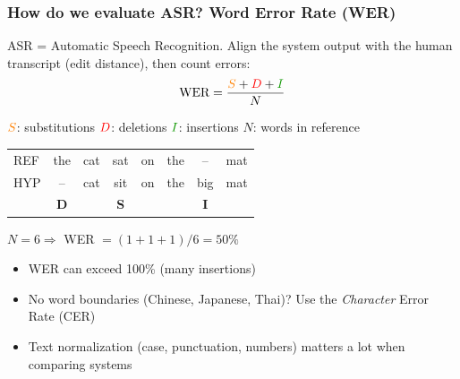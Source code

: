 \documentclass[table]{beamer}
\begin{document}


\begin{frame}\frametitle{How do we evaluate ASR? Word Error Rate (WER)}

ASR = Automatic Speech Recognition. Align the system output with the human transcript (edit distance), then count errors:
\begin{equation*}
	\text{WER} = \frac{{\color{orange}S} + {\color{red}D} + {\color{LigAikumaGreen}I}}{N}
\end{equation*}
\vspace*{-0.6em}
\begin{center}
{\small ${\color{orange}S}$: substitutions \quad ${\color{red}D}$: deletions \quad ${\color{LigAikumaGreen}I}$: insertions \quad $N$: words in reference}

\vspace*{0.6em}
\renewcommand{\arraystretch}{1.25}
\begin{tabular}{l|ccccccc}
	REF & the & cat & {\color{orange}sat} & on & the & {\color{LigAikumaGreen}--} & mat \\
	HYP & {\color{red}--} & cat & {\color{orange}sit} & on & the & {\color{LigAikumaGreen}big} & mat \\
	\hline
	    & {\color{red}\textbf{D}} & & {\color{orange}\textbf{S}} & & & {\color{LigAikumaGreen}\textbf{I}} & \\
\end{tabular}

\vspace*{0.4em}
$N=6 \Rightarrow$ WER $= (1+1+1)/6 = 50\%$
\end{center}

\vspace*{-0.2em}
\begin{itemize}
	\item WER can exceed 100\% (many insertions)
	\item No word boundaries (Chinese, Japanese, Thai)? Use the \textit{Character} Error Rate (CER)
	\item Text normalization (case, punctuation, numbers) matters a lot when comparing systems
\end{itemize}

\end{frame}

\end{document}
